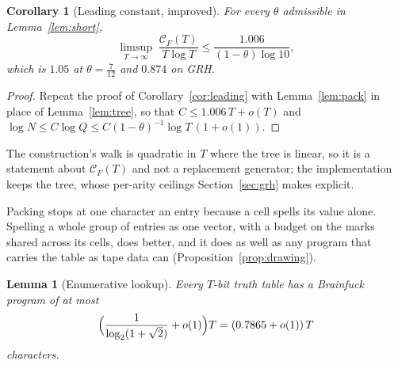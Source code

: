 \documentclass[11pt]{article}
\newtheorem{lemma}[theorem]{Lemma}
\newtheorem{corollary}[theorem]{Corollary}
\theoremstyle{remark}
\newcommand{\CF}{\mathcal C_F}
\begin{document}
\begin{corollary}[Leading constant, improved]\label{cor:chain}
For every $\theta$ admissible in Lemma~\ref{lem:short},
\[
  \limsup_{T\to\infty}\;\frac{\CF(T)}{T\log T}
  \le\frac{1.006}{(1-\theta)\log10},
\]
which is $1.05$ at $\theta=\frac7{12}$ and $0.874$ on GRH.
\end{corollary}

\begin{proof}
Repeat the proof of Corollary~\ref{cor:leading} with Lemma~\ref{lem:pack}
in place of Lemma~\ref{lem:tree}, so that $C\le1.006\,T+o(T)$ and
$\log N\le C\log Q\le C(1-\theta)^{-1}\log T\,(1+o(1))$.
\end{proof}

The construction's walk is quadratic in $T$ where the tree is linear, so it
is a statement about $\CF(T)$ and not a replacement generator; the
implementation keeps the tree, whose per-arity ceilings Section~\ref{sec:grh}
makes explicit.

Packing stops at one character an entry because a cell spells its value
alone.  Spelling a whole group of entries as one vector, with a budget on the
marks shared across its cells, does better, and it does as well as any
program that carries the table as tape data can
(Proposition~\ref{prop:drawing}).

\begin{lemma}[Enumerative lookup]\label{lem:draw}
Every $T$-bit truth table has a Brainfuck program of at most
\[
  \Bigl(\frac{1}{\log_2(1+\sqrt2)}+o(1)\Bigr)T=(0.7865+o(1))\,T
\]
characters.
\end{lemma}
\end{document}
